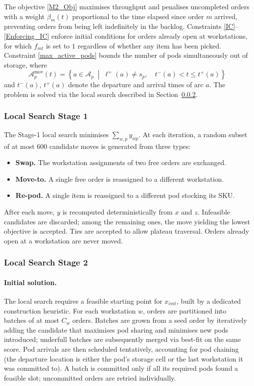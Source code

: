 \documentclass[a4paper,10pt]{article}
\begin{document}
The objective \eqref{M2_Obj} maximises throughput and penalises uncompleted orders with a weight $\beta_m(t)$ proportional to the time elapsed since order $m$ arrived, preventing orders from being left indefinitely in the backlog.
Constraints \eqref{IC}--\eqref{Enforcing_IC} enforce initial conditions for orders already open at workstations, for which $f_{mt}$ is set to $1$ regardless of whether any item has been picked. Constraint \eqref{max_active_pods} bounds the
number of pods simultaneously out of storage, where
\[
\mathcal{A}^{\text{mov}}_p(t) =
\left\{a \in \mathcal{A}_p \;\middle|\;
\ell^+(a) \neq s_p,\quad t^-(a) < t \le t^+(a)\right\}
\]
and $t^-(a)$, $t^+(a)$ denote the departure and arrival times of arc $a$.
The problem is solved via the local search described in Section~\ref{sss:ls_stage2}.


\subsubsection{Local Search Stage 1}
\label{sss:ls_stage1}

The Stage-1 local search minimises $\sum_{w,p} y_{wp}$. At each iteration, a random subset of at most $600$ candidate moves is generated from three types:

\begin{itemize}[noitemsep]
    \item \textbf{Swap.} The workstation assignments of two free orders are exchanged.
    \item \textbf{Move-to.} A single free order is reassigned to a different workstation.
    \item \textbf{Re-pod.} A single item is reassigned to a different pod stocking its SKU.
\end{itemize}

After each move, $y$ is recomputed deterministically from $x$ and $z$. Infeasible candidates are discarded; among the remaining ones, the move yielding the lowest objective is accepted. Ties are accepted to allow plateau traversal. Orders already open at a workstation are never moved. 

\subsubsection{Local Search Stage 2}
\label{sss:ls_stage2}

\paragraph{Initial solution.}
The local search requires a feasible starting point for $x_{imt}$, built by a dedicated construction heuristic. For each workstation $w$, orders are partitioned into batches of at most $C_w$ orders. Batches are grown from a seed order by iteratively adding the candidate that maximises pod sharing and minimises new pods introduced; underfull batches are subsequently merged via best-fit on the same score. 
Pod arrivals are then scheduled tentatively, accounting for pod chaining (the departure location is either the pod's storage cell or the last workstation it was committed to). 
A batch is committed only if all its required pods found a feasible slot; uncommitted orders are retried individually.
\end{document}
